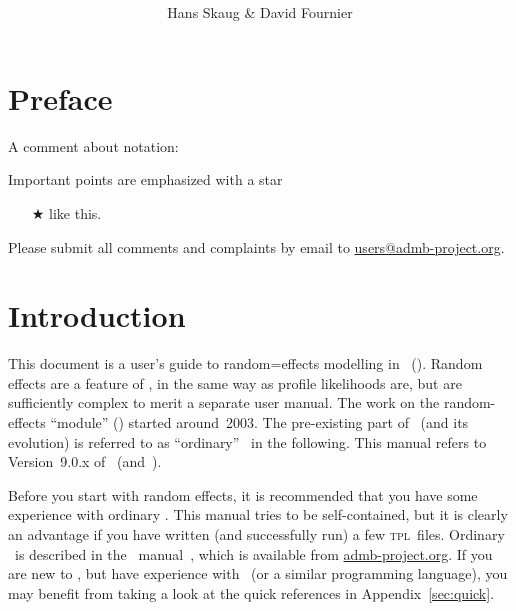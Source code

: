 \documentclass{admbmanual}
\begin{document}
\title{%
}
\author{Hans Skaug \& David Fournier}

\maketitle

\tableofcontents

\chapter*{Preface}

A comment about notation:

Important points are emphasized with a star
\begin{itemize}
\item[$\bigstar$] like this.
\end{itemize}

Please submit all comments and complaints by email to
\href{mailto:users@admb-project.org}{users@admb-project.org}.

\chapter{Introduction}

This document is a user's guide to random=effects modelling in \ADM\ (\scAB).
Random effects are a feature of \scAB, in the same way as profile likelihoods
are, but are sufficiently complex to merit a separate user manual. The work on
the random-effects ``module'' (\scAR) started around~2003. The pre-existing part
of \scAB\ (and its evolution) is referred to as ``ordinary'' \scAB\ in the
following. This manual refers to Version~9.0.x of \scAB\ (and~\scAR).

Before you start with random effects, it is recommended that you have some
experience with ordinary \scAB. This manual tries to be self-contained, but it
is clearly an advantage if you have written (and successfully run) a few
\textsc{tpl}~files. Ordinary \scAB\ is described in the \scAB\
manual~\cite{admb_manual}, which is available from
\href{mailto:admb-project.org}{admb-project.org}. If you are new to \scAB, but
have experience with \cplus\ (or a similar programming language), you may
benefit from taking a look at the quick references in Appendix~\ref{sec:quick}.
\end{document}
